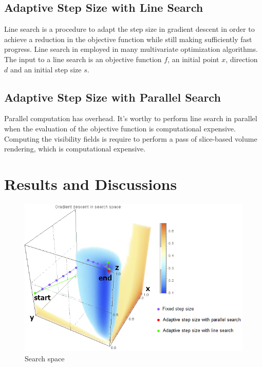\subsection{Adaptive Step Size with Line Search}
Line search is a procedure to adapt the step size in gradient descent in order to achieve a reduction in the objective function while still making sufficiently fast progress. Line search in employed in many multivariate optimization algorithms.
The input to a line search is an objective function $ f $, an initial point $ x $, direction $ d $ and an initial step size $ s $.

\subsection{Adaptive Step Size with Parallel Search}
Parallel computation has overhead.
It's worthy to perform line search in parallel when the evaluation of the objective function is computational expensive.
Computing the visibility fields is require to perform a pass of slice-based volume rendering, which is computational expensive.

\section{Results and Discussions}

\begin{figure}
	\centering
	\begin{minipage}{.9\textwidth}
		\includegraphics[width=1\linewidth]{images/searchspace_path}
	\end{minipage}
	\caption{Search space}
	\label{fig:nucleon_searchspace_path}
\end{figure}

